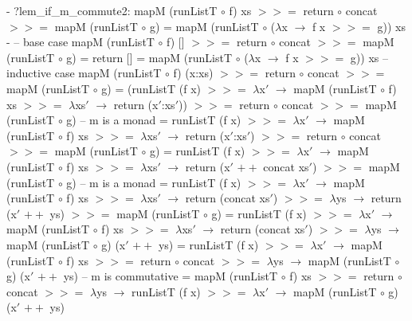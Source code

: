 \documentclass{article}
\newcommand{\hbind}{>\!\!\!>\!\!\!=}
\newcommand{\happend}{+\!\!\!+}
\begin{document}
\begin{enumerate}
\begin{code}
{- ?lem_if_m_commute2:
        mapM (runListT $\circ$ f) xs $\hbind$ return $\circ$ concat $\hbind$ mapM (runListT $\circ$ g)
     = mapM (runListT $\circ$ ($\lambda$x $\to$ f x $\hbind$ g)) xs
 -}
-- base case
   mapM (runListT $\circ$ f) [] $\hbind$ return $\circ$ concat $\hbind$ mapM (runListT $\circ$ g)
= return []
= mapM (runListT $\circ$ ($\lambda$x $\to$ f x $\hbind$ g)) xs
-- inductive case
   mapM (runListT $\circ$ f) (x:xs) $\hbind$ return $\circ$ concat $\hbind$ mapM (runListT $\circ$ g)
= (runListT (f x) $\hbind$ $\lambda$x$'$ $\to$ mapM (runListT $\circ$ f) xs $\hbind$ $\lambda$xs$'$ $\to$ return (x$'$:xs$'$)) $\hbind$ return $\circ$ concat $\hbind$ mapM (runListT $\circ$ g)
-- m is a monad
= runListT (f x) $\hbind$ $\lambda$x$'$ $\to$ mapM (runListT $\circ$ f) xs $\hbind$ $\lambda$xs$'$ $\to$ return (x$'$:xs$'$) $\hbind$ return $\circ$ concat $\hbind$ mapM (runListT $\circ$ g)
= runListT (f x) $\hbind$ $\lambda$x$'$ $\to$ mapM (runListT $\circ$ f) xs $\hbind$ $\lambda$xs$'$ $\to$ return (x$'$ $\happend$ concat xs$'$) $\hbind$ mapM (runListT $\circ$ g)
-- m is a monad
= runListT (f x) $\hbind$ $\lambda$x$'$ $\to$ mapM (runListT $\circ$ f) xs $\hbind$ $\lambda$xs$'$ $\to$ return (concat xs$'$) $\hbind$ $\lambda$ys $\to$ return (x$'$ $\happend$ ys) $\hbind$ mapM (runListT $\circ$ g)
= runListT (f x) $\hbind$ $\lambda$x$'$ $\to$ mapM (runListT $\circ$ f) xs $\hbind$ $\lambda$xs$'$ $\to$ return (concat xs$'$) $\hbind$ $\lambda$ys $\to$ mapM (runListT $\circ$ g) (x$'$ $\happend$ ys)
= runListT (f x) $\hbind$ $\lambda$x$'$ $\to$ mapM (runListT $\circ$ f) xs $\hbind$ return $\circ$ concat $\hbind$ $\lambda$ys $\to$ mapM (runListT $\circ$ g) (x$'$ $\happend$ ys)
-- m is commutative
= mapM (runListT $\circ$ f) xs $\hbind$ return $\circ$ concat $\hbind$ $\lambda$ys $\to$ runListT (f x) $\hbind$ $\lambda$x$'$ $\to$ mapM (runListT $\circ$ g) (x$'$ $\happend$ ys)
\end{code}
\end{enumerate}
\end{document}
